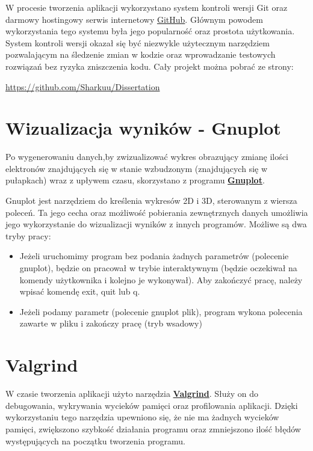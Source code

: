 W procesie tworzenia aplikacji wykorzystano system kontroli wersji Git oraz darmowy hostingowy serwis internetowy \href{https://github.com/}{GitHub}.
Głównym powodem wykorzystania tego systemu była jego popularność oraz prostota użytkowania.
System kontroli wersji okazał się być niezwykle użytecznym narzędziem pozwalającym na
śledzenie zmian w kodzie oraz wprowadzanie testowych rozwiązań bez
ryzyka zniszczenia kodu. Cały projekt można pobrać ze strony:
\begin{center}
\url{https://github.com/Sharkuu/Dissertation}
\end{center}

\section{Wizualizacja wyników - Gnuplot}

Po wygenerowaniu danych,by zwizualizować wykres obrazujący zmianę ilości elektronów znajdujących się w stanie wzbudzonym (znajdujących się w pułapkach) wraz z upływem czasu, skorzystano z programu \href{http://www.gnuplot.info/}{\textbf{Gnuplot}}.

Gnuplot jest narzędziem do kreślenia wykresów 2D i 3D, sterowanym z wiersza poleceń. Ta jego cecha oraz możliwość pobierania zewnętrznych danych umożliwia jego wykorzystanie do wizualizacji wyników z innych programów. Możliwe są dwa tryby pracy:
\begin{itemize}
\item Jeżeli uruchomimy program bez podania żadnych parametrów (polecenie gnuplot), będzie on pracował w trybie interaktywnym (będzie oczekiwał na komendy użytkownika i kolejno je wykonywał). Aby zakończyć pracę, należy wpisać komendę exit, quit lub q.
\item Jeżeli podamy parametr (polecenie gnuplot plik), program wykona polecenia zawarte w pliku i zakończy pracę (tryb wsadowy)
\end{itemize}

\section{Valgrind}
W czasie tworzenia aplikacji użyto narzędzia \href{http://valgrind.org/}{\textbf{Valgrind}}. Służy on do debugowania, wykrywania wycieków pamięci oraz profilowania aplikacji. Dzięki wykorzystaniu tego narzędzia upewniono się, że nie ma żadnych wycieków pamięci, zwiększono szybkość działania programu oraz zmniejszono ilość błędów występujących na początku tworzenia programu.